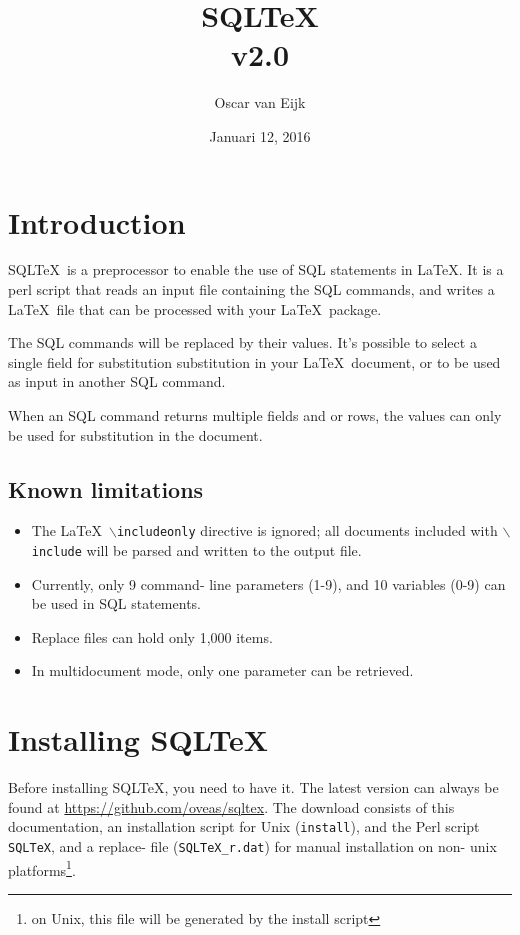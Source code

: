 \documentclass{article}
\newcommand{\bs}{\ensuremath{\backslash}}
\begin{document}
\title{SQL\TeX\\v2.0}
\date{Januari 12, 2016}
\author{Oscar van Eijk}
\maketitle
\hrulefill
\tableofcontents
\hrulefill

\section{Introduction}

SQL\TeX\ is a preprocessor to enable the use of SQL statements in \LaTeX. It is a perl script that reads
an input file containing the SQL commands, and writes a \LaTeX\ file that can be processed with your
\LaTeX\ package.

The SQL commands will be replaced by their values. It's possible to select a single field for substitution
substitution in your \LaTeX\ document, or to be used as input in another SQL command.

When an SQL command returns multiple fields and or rows, the values can only be used for substitution
in the document.

\subsection{Known limitations}

\begin{itemize}
\item The \LaTeX\ \texttt{\bs includeonly} directive is ignored; all documents included with \texttt{\bs include} will be parsed and written to the output file.
\item Currently, only 9 command- line parameters (1-9), and 10 variables (0-9) can be used in SQL statements.
\item Replace files can hold only 1,000 items.
\item In multidocument mode, only one parameter can be retrieved.
\end{itemize}

\section{Installing SQL\TeX}

Before installing SQL\TeX, you need to have it. The latest version can always be found at
\url{https://github.com/oveas/sqltex}.
The download consists of this do\-cumentation, an installation script for Unix
(\texttt{install}), and the Perl script \texttt{SQLTeX}, and a replace- file (\texttt{SQLTeX\_r.dat}) for manual installation
on non- unix platforms\footnote{on Unix, this file will be generated by the install script}.
\end{document}
